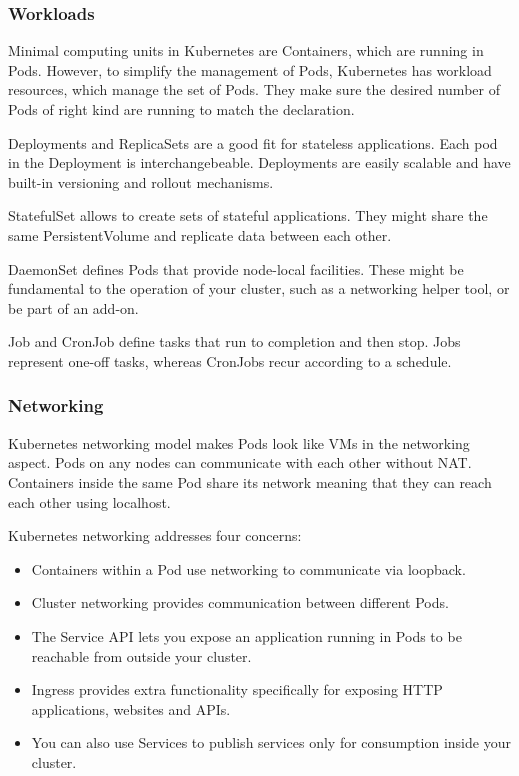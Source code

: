 \subsubsection*{Workloads}

Minimal computing units in Kubernetes are Containers, which are running in Pods. However, to simplify the management of Pods, Kubernetes has workload resources, which manage the set of Pods. They make sure the desired number of Pods of right kind are running to match the declaration.

Deployments and ReplicaSets are a good fit for stateless applications. Each pod in the Deployment is interchangebeable. Deployments are easily scalable and have built-in versioning and rollout mechanisms.

StatefulSet allows to create sets of stateful applications. They might share the same PersistentVolume and replicate data between each other.

DaemonSet defines Pods that provide node-local facilities. These might be fundamental to the operation of your cluster, such as a networking helper tool, or be part of an add-on.

Job and CronJob define tasks that run to completion and then stop. Jobs represent one-off tasks, whereas CronJobs recur according to a schedule.

\subsubsection*{Networking}

Kubernetes networking model makes Pods look like VMs in the networking aspect. Pods on any nodes can communicate with each other without NAT. Containers inside the same Pod share its network meaning that they can reach each other using localhost.

Kubernetes networking addresses four concerns:
\begin{itemize}
\item Containers within a Pod use networking to communicate via loopback.
\item Cluster networking provides communication between different Pods.
\item The Service API lets you expose an application running in Pods to be reachable from outside your cluster.
\item Ingress provides extra functionality specifically for exposing HTTP applications, websites and APIs.
\item You can also use Services to publish services only for consumption inside your cluster.
\end{itemize}

